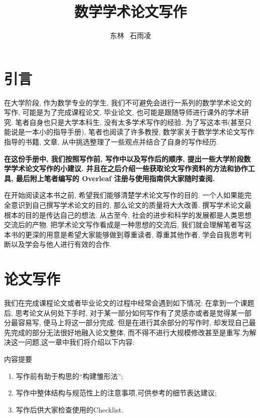 \documentclass{booki}
\begin{document}
\title{数学学术论文写作}
\author{东林 \ 石雨凌}
\maketitlepage
\tableofcontents
\setlength{\parskip}{1.5em}
\newpage
\chapter{引言}
在大学阶段, 作为数学专业的学生, 我们不可避免会进行一系列的数学学术论文的写作, 可能是为了完成课程论文, 毕业论文, 也可能是跟随导师进行课外的学术研究. 笔者自身也只是大学本科生, 没有太多学术写作的经验. 为了写这本书(甚至只能说是一本小的指导手册), 笔者也阅读了许多教授, 数学家关于数学学术论文写作指导的书籍, 文章, 从中挑选整理了一些观点并结合了自身的写作经历.

{\textbf{在这份手册中, 我们按照写作前, 写作中以及写作后的顺序, 提出一些大学阶段数学学术论文写作的小建议. 并且在之后介绍一些获取论文写作资料的方法和协作工具, 最后附上笔者编写的 Overleaf 注册与使用指南供大家随时查阅.}}

\par 在开始阅读这本书之前, 希望我们能够清楚学术论文写作的目的. 一个人如果能完全意识到自己撰写学术论文的目的, 那么论文的质量将大大改善. 撰写学术论文最根本的目的是传达自己的想法. 从古至今, 社会的进步和科学的发展都是人类思想交流后的产物. 把学术论文写作看成是一种思想的交流后, 我们就会理解笔者写这本书的更深的用意是希望大家能够做到尊重读者, 尊重其他作者, 学会自我思考判断以及学会与他人进行有效的合作.

\chapter{论文写作}
我们在完成课程论文或者毕业论文的过程中经常会遇到如下情况: 在拿到一个课题后, 思考论文从何处下手时, 对于某一部分如何写作有了灵感亦或者是觉得某一部分最容易写, 便马上将这一部分完成. 但是在进行其余部分的写作时, 却发现自己最先完成的部分无法很好地融入论文整体, 而不得不进行大规模修改甚至是重写.为解决这一问题,这一章中我们将介绍以下内容: 

\begin{titledBox}{内容提要}
\begin{enumerate}
            \item 写作前有助于构思的``构建雏形法”;
            \item 写作中整体结构与规范性上的注意事项,可供参考的细节表达建议;
            \item 写作后供大家检查使用的Checklist.
        \end{enumerate}
\end{titledBox}
\end{document}
